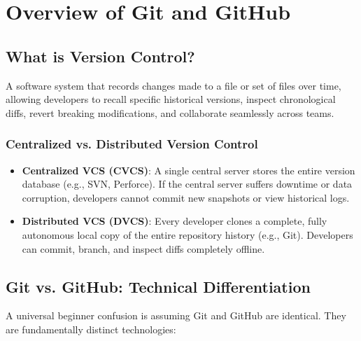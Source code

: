 \section{Overview of Git and GitHub}

\subsection{What is Version Control?}

\begin{definition}
A software system that records changes made to a file or set of files over time, allowing developers to recall specific historical versions, inspect chronological diffs, revert breaking modifications, and collaborate seamlessly across teams.
\end{definition}

\subsubsection{Centralized vs. Distributed Version Control}
\begin{itemize}[leftmargin=1.5em]
    \item \textbf{Centralized VCS (CVCS)}: A single central server stores the entire version database (e.g., SVN, Perforce). If the central server suffers downtime or data corruption, developers cannot commit new snapshots or view historical logs.
    \item \textbf{Distributed VCS (DVCS)}: Every developer clones a complete, fully autonomous local copy of the entire repository history (e.g., Git). Developers can commit, branch, and inspect diffs completely offline.
\end{itemize}

\subsection{Git vs. GitHub: Technical Differentiation}

A universal beginner confusion is assuming Git and GitHub are identical. They are fundamentally distinct technologies:

